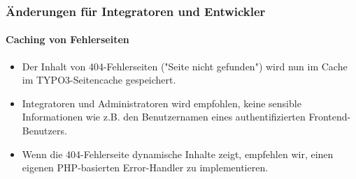 %

\begin{frame}[fragile]
	\frametitle{Änderungen für Integratoren und Entwickler}
	\framesubtitle{Caching von Fehlerseiten}

	\begin{itemize}
		\item Der Inhalt von 404-Fehlerseiten ("Seite nicht gefunden") wird nun
			im Cache im TYPO3-Seitencache gespeichert.
		\item Integratoren und Administratoren wird empfohlen, keine sensible
			Informationen wie z.B. den Benutzernamen eines authentifizierten
			Frontend-Benutzers.
		\item Wenn die 404-Fehlerseite dynamische Inhalte zeigt, empfehlen wir,
			einen eigenen PHP-basierten Error-Handler zu implementieren.
	\end{itemize}

\end{frame}

